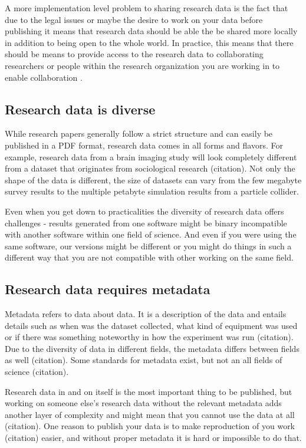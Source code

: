 A more implementation level problem to sharing research data is the fact that
due to the legal issues or maybe the desire to work on your data before
publishing it means that research data should be able the be shared more
locally in addition to being open to the whole world. In practice, this means
that there should be means to provide access to the research data to
collaborating researchers or people within the research organization you are
working in to enable collaboration \cite{DBLP:journals/libt/Witt08}.

\iffalse
\subsection{Research data is diverse}

While research papers generally follow a
strict structure and can easily be published in a PDF format, research data
comes in all forms and flavors. For example, research data from a brain imaging
study will look completely different from a dataset that originates from
sociological research (citation). Not only the shape of the data is different,
the size of datasets can vary from the few megabyte survey results to the
multiple petabyte simulation results from a particle collider.

Even when you get down to practicalities the diversity of research data offers
challenges - results generated from one software might be binary incompatible
with another software within one field of science. And even if you were using
the same software, our versions might be different or you might do things in
such a different way that you are not compatible with other working on the
same field.

\subsection{Research data requires metadata}

Metadata refers to data about data. It is a description of the data and entails
details such as when was the dataset collected, what kind of equipment was
used or if there was something noteworthy in how the experiment was run
(citation). Due to the diversity of data in different fields, the metadata
differs between fields as well (citation). Some standards for metadata exist,
but not an all fields of science (citation).

Research data in and on itself is the most important thing to be published, but
working on someone else's research data without the relevant metadata adds
another layer of complexity and might mean that you cannot use the data at all
(citation). One reason to publish your data is to make reproduction of you work
(citation) easier, and without proper metadata it is hard or impossible to
do that.

